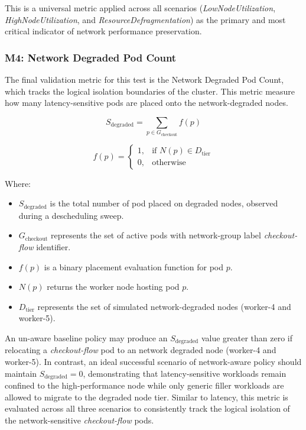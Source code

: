 This is a universal metric applied across all scenarios (\textit{LowNodeUtilization}, \textit{HighNodeUtilization}, and \textit{ResourceDefragmentation}) as the primary and most critical indicator of network performance preservation.

\subsubsection{M4: Network Degraded Pod Count}
\label{subsubsec:netaware4_evaluationmetrics4}
The final validation metric for this test is the Network Degraded Pod Count, which tracks the logical isolation boundaries of the cluster. This metric measure how many latency-sensitive pods are placed onto the network-degraded nodes.

\[
S_{\text{degraded}}
=
\sum_{p \in G_{\text{checkout}}} f(p)
\]

\[
f(p)
=
\begin{cases}
1, & \text{if } N(p) \in D_{\text{tier}} \\
0, & \text{otherwise}
\end{cases}
\]

Where:

\begin{itemize}
    \item \(S_{\text{degraded}}\) is the total number of pod placed on degraded nodes, observed during a descheduling sweep.

    \item \(G_{\text{checkout}}\) represents the set of active pods with network-group label \textit{checkout-flow} identifier.

    \item \(f(p)\) is a binary placement evaluation function for pod \(p\).

    \item \(N(p)\) returns the worker node hosting pod \(p\).

    \item \(D_{\text{tier}}\) represents the set of simulated network-degraded nodes (worker-4 and worker-5).
\end{itemize}

An un-aware baseline policy may produce an \(S_{\text{degraded}}\) value greater than zero if relocating a \textit{checkout-flow} pod to an network degraded node (worker-4 and worker-5). In contrast, an ideal successful scenario of network-aware policy should maintain \(S_{\text{degraded}} = 0\), demonstrating that latency-sensitive workloads remain confined to the high-performance node while only generic filler workloads are allowed to migrate to the degraded node tier. Similar to latency, this metric is evaluated across all three scenarios to consistently track the logical isolation of the network-sensitive \textit{checkout-flow} pods.

